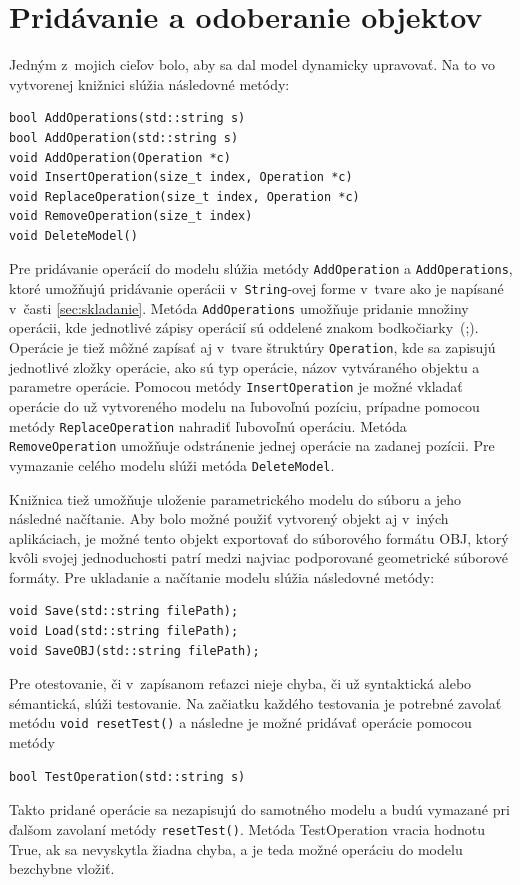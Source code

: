 \section{Pridávanie a odoberanie objektov}
\label{sec:addAndRemoveObjects}
Jedným z~mojich cieľov bolo, aby sa dal model dynamicky upravovať. Na to vo vytvorenej knižnici slúžia následovné metódy:
\lstset {language=C++}
\begin{lstlisting}
bool AddOperations(std::string s)
bool AddOperation(std::string s)
void AddOperation(Operation *c) 
void InsertOperation(size_t index, Operation *c)
void ReplaceOperation(size_t index, Operation *c)
void RemoveOperation(size_t index)
void DeleteModel()
\end{lstlisting}
Pre pridávanie operácií do modelu slúžia metódy \texttt{AddOperation}  a \texttt{AddOperations}, ktoré umožňujú pridávanie operácii v~\texttt{String}-ovej forme v~tvare ako je napísané v~časti \ref{sec:skladanie}. Metóda \texttt{AddOperations} umožňuje pridanie množiny operácii, kde jednotlivé zápisy operácií sú oddelené znakom bodkočiarky~(;).  Operácie je tiež môžné zapísať aj v~tvare štruktúry \texttt{Operation}, kde sa zapisujú jednotlivé zložky operácie, ako sú typ operácie, názov vytváraného objektu a parametre operácie.
Pomocou metódy \texttt{InsertOperation} je možné vkladať operácie do už vytvoreného modelu na ľubovoľnú pozíciu, prípadne pomocou metódy \texttt{ReplaceOperation} nahradiť ľubovoľnú operáciu. 
Metóda \texttt{RemoveOperation} umožňuje odstránenie jednej operácie na zadanej pozícii. Pre vymazanie celého modelu slúži metóda \texttt{DeleteModel}. 


Knižnica tiež umožňuje uloženie parametrického modelu do  súboru a jeho následné načítanie. Aby bolo možné použiť vytvorený objekt aj v~iných aplikáciach, je možné tento objekt exportovať do súborového formátu OBJ, ktorý kvôli svojej jednoduchosti patrí medzi najviac podporované geometrické súborové formáty. Pre ukladanie a načítanie modelu slúžia následovné metódy:
\lstset {language=C++}
\begin{lstlisting}
void Save(std::string filePath);
void Load(std::string filePath);
void SaveOBJ(std::string filePath);
\end{lstlisting}

Pre otestovanie, či v~zapísanom reťazci nieje chyba, či už syntaktická alebo sémantická, slúži testovanie. Na začiatku každého testovania je potrebné zavolať metódu \texttt{void resetTest()} a následne je možné pridávať operácie pomocou metódy 
\lstset {language=C++}
\begin{lstlisting}
bool TestOperation(std::string s)
\end{lstlisting}
Takto pridané operácie sa nezapisujú do samotného modelu a budú vymazané pri ďalšom zavolaní metódy \texttt{resetTest()}. Metóda TestOperation vracia hodnotu True, ak sa nevyskytla žiadna chyba, a je teda možné operáciu do modelu bezchybne vložiť.


